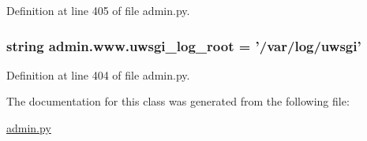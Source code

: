 Definition at line 405 of file admin.\-py.

\hypertarget{classadmin_1_1www_a5ea11af52a64e25886b747ac675827a5}{
\subsubsection[{uwsgi\-\_\-log\-\_\-root}]{\setlength{\rightskip}{0pt plus 5cm}string admin.\-www.\-uwsgi\-\_\-log\-\_\-root = '/var/log/{\bf uwsgi}'\hspace{0.3cm}{\ttfamily [static]}}}\label{classadmin_1_1www_a5ea11af52a64e25886b747ac675827a5}


Definition at line 404 of file admin.\-py.



The documentation for this class was generated from the following file\-:\begin{DoxyCompactItemize}
\item 
\hyperlink{admin_8py}{admin.\-py}\end{DoxyCompactItemize}
